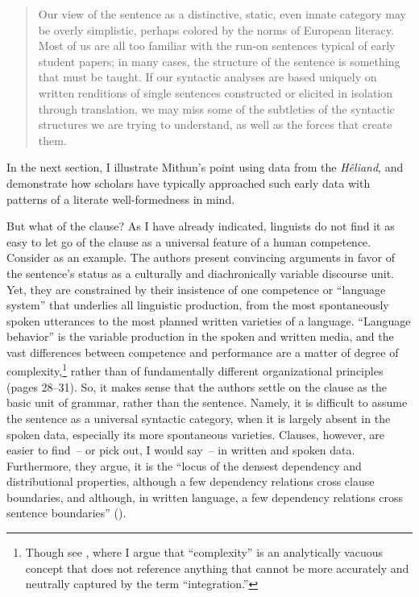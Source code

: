 \begin{quote}
Our view of the sentence as a distinctive, static, even innate category may be overly simplistic, perhaps colored by the norms of European literacy. Most of us are all too familiar with the run-on sentences typical of early student papers; in many cases, the structure of the sentence is something that must be taught. If our syntactic analyses are based uniquely on written renditions of single sentences constructed or elicited in isolation through translation, we may miss some of the subtleties of the syntactic structures we are trying to understand, as well as the forces that create them.
\end{quote}

\noindent In the next section, I illustrate Mithun’s point using data from the \textit{Hêliand}, and demonstrate how scholars have typically approached such early data with patterns of a literate well-formedness in mind.

But what of the clause? As I have already indicated, linguists do not find it as easy to let go of the clause as a universal feature of a human competence. Consider \citet{MillerWeinert1998} as an example. The authors present convincing arguments in favor of the sentence’s status as a culturally and diachronically variable discourse unit. Yet, they are constrained by their insistence of one competence or “language system” that underlies all linguistic production, from the most spontaneously spoken utterances to the most planned written varieties of a language. “Language behavior” is the variable production in the spoken and written media, and the vast differences between competence and performance are a matter of degree of complexity,\footnote{{Though see , where I argue that “complexity” is an analytically vacuous concept that does not reference anything that cannot be more accurately and neutrally captured by the term “integration.”} } rather than of fundamentally different organizational principles (pages 28--31). So, it makes sense that the authors settle on the clause as the basic unit of grammar, rather than the sentence. Namely, it is difficult to assume the sentence as a universal syntactic category, when it is largely absent in the spoken data, especially its more spontaneous varieties. Clauses, however, are easier to find~-- or pick out, I would say~-- in written and spoken data. Furthermore, they argue, it is the “locus of the densest dependency and distributional properties, although a few dependency relations cross clause boundaries, and although, in written language, a few dependency relations cross sentence boundaries” (\citealt[46, 50]{MillerWeinert1998}).

